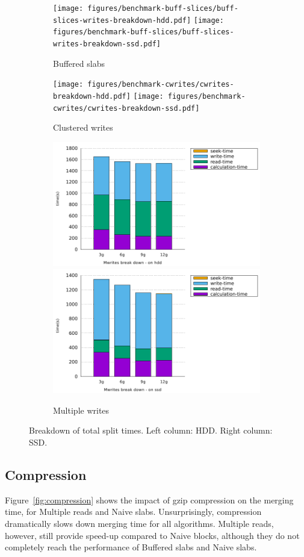\documentclass[10pt, conference, compsocconf]{IEEEtran}
\begin{document}
\begin{figure}
  \begin{subfigure}[b]{\columnwidth}
    \texttt{[image: figures/benchmark-buff-slices/buff-slices-writes-breakdown-hdd.pdf]}
    \texttt{[image: figures/benchmark-buff-slices/buff-slices-writes-breakdown-ssd.pdf]}
    \caption{Buffered slabs}
  \end{subfigure}
  \begin{subfigure}[b]{\columnwidth}
    \texttt{[image: figures/benchmark-cwrites/cwrites-breakdown-hdd.pdf]}
    \texttt{[image: figures/benchmark-cwrites/cwrites-breakdown-ssd.pdf]}
    \caption{Clustered writes}
  \end{subfigure}
  \begin{subfigure}[b]{\columnwidth}
    \includegraphics[width=0.45\columnwidth]{figures/benchmark-mwrites/mwrites-breakdown-hdd.pdf}
    \includegraphics[width=0.45\columnwidth]{figures/benchmark-mwrites/mwrites-breakdown-ssd.pdf}
    \caption{Multiple writes}
  \end{subfigure}
  \caption{Breakdown of total split times. Left column: HDD. Right column: SSD.}
  \label{fig:breakdowns-ssd-split}
\end{figure}

\subsection{Compression}

Figure~\ref{fig:compression} shows the impact of gzip compression on
the merging time, for Multiple reads and Naive slabs.
Unsurprisingly, compression dramatically slows down merging time for
all algorithms. Multiple reads, however, still provide 
speed-up compared to Naive blocks, although they do
not completely reach the performance of Buffered slabs and Naive
slabs.
\end{document}
